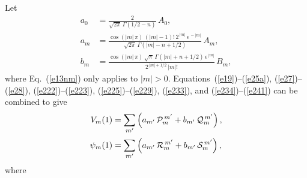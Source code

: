 \documentclass[12pt,prb,aps]{revtex4-1}
\begin{document}
Let 
\begin{align}\label{e11cc}
a_0 &= \frac{2}{\sqrt{2\pi}\,\Gamma(1/2-n)}\,A_0,\\[0.5ex]
a_m &= \frac{\cos(|m|\,\pi)\,(|m|-1)!\,2^{\,|m|}\,\epsilon^{\,-|m|}}{\sqrt{2\pi}\,\Gamma(|m|-n+1/2)}\,A_m,\label{e13nm}\\[0.5ex]
b_m &= \frac{\cos(|m|\,\pi)\,\sqrt{\pi}\,\Gamma(|m|+n+1/2)\,\epsilon^{\,|m|}}{2^{\,|m|+1/2}\,|m|!}\,B_m,\label{e13cc}
\end{align}
where Eq.~(\ref{e13nm}) only  applies to $|m|>0$. 
Equations~(\ref{e19})--(\ref{e25a}), (\ref{e27})--(\ref{e28}), (\ref{e222})--(\ref{e223}), (\ref{e225})--(\ref{e229}), (\ref{e233}), and (\ref{e234})--(\ref{e241})
can be combined to give
\begin{align}
V_m(1) &= \sum_{m'}\left(a_{m'}\,{\cal P}_m^{\,m'} + b_{m'}\,{\cal Q}_{m}^{\,m'}\right),\label{e27cc}\\[0.5ex]
\psi_m(1)& = \sum_{m'}\left(a_{m'}\,{\cal R}_m^{\,m'} + b_{m'}\,{\cal S}_{m}^{\,m'}\right),\label{e54cc}
\end{align}
where\,\cite{am1}
\end{document}
